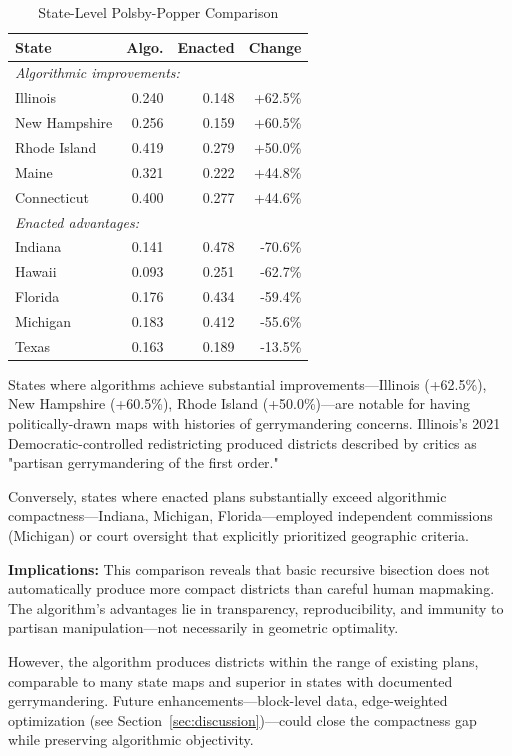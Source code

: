\begin{table}[h]
\centering
\caption{State-Level Polsby-Popper Comparison}
\label{tab:state_comparison}
\small
\begin{tabular}{lrrr}
\toprule
\textbf{State} & \textbf{Algo.} & \textbf{Enacted} & \textbf{Change} \\
\midrule
\multicolumn{4}{l}{\textit{Algorithmic improvements:}} \\
Illinois & 0.240 & 0.148 & +62.5\% \\
New Hampshire & 0.256 & 0.159 & +60.5\% \\
Rhode Island & 0.419 & 0.279 & +50.0\% \\
Maine & 0.321 & 0.222 & +44.8\% \\
Connecticut & 0.400 & 0.277 & +44.6\% \\
\midrule
\multicolumn{4}{l}{\textit{Enacted advantages:}} \\
Indiana & 0.141 & 0.478 & -70.6\% \\
Hawaii & 0.093 & 0.251 & -62.7\% \\
Florida & 0.176 & 0.434 & -59.4\% \\
Michigan & 0.183 & 0.412 & -55.6\% \\
Texas & 0.163 & 0.189 & -13.5\% \\
\bottomrule
\end{tabular}
\end{table}

States where algorithms achieve substantial improvements—Illinois (+62.5\%), New Hampshire (+60.5\%), Rhode Island (+50.0\%)—are notable for having politically-drawn maps with histories of gerrymandering concerns. Illinois's 2021 Democratic-controlled redistricting produced districts described by critics as "partisan gerrymandering of the first order."

Conversely, states where enacted plans substantially exceed algorithmic compactness—Indiana, Michigan, Florida—employed independent commissions (Michigan) or court oversight that explicitly prioritized geographic criteria.

\textbf{Implications:} This comparison reveals that basic recursive bisection does not automatically produce more compact districts than careful human mapmaking. The algorithm's advantages lie in transparency, reproducibility, and immunity to partisan manipulation—not necessarily in geometric optimality.

However, the algorithm produces districts within the range of existing plans, comparable to many state maps and superior in states with documented gerrymandering. Future enhancements—block-level data, edge-weighted optimization (see Section~\ref{sec:discussion})—could close the compactness gap while preserving algorithmic objectivity.

